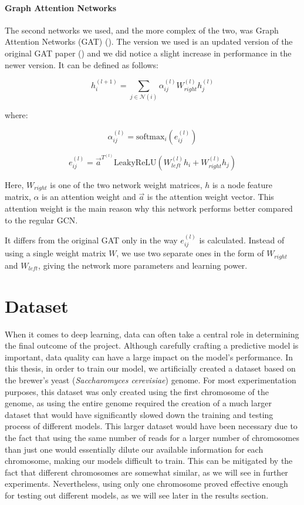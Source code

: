 \documentclass[times, utf8, diplomski, english]{fer_eng}
\begin{document}
\subsubsection{Graph Attention Networks}

The second networks we used, and the more complex of the two, was Graph Attention Networks (GAT) (\cite{GATv2}). The version we used is an updated version of the original GAT paper (\cite{GAT}) and we did notice a slight increase in performance in the newer version. It can be defined as follows:

\[ h_i^{(l+1)} = \sum_{j \in \mathcal{N}(i)} \alpha_{ij}^{(l)} W_{right}^{(l)} h_j^{(l)} \]

where:

\[ \alpha_{ij}^{(l)} = \mathrm{softmax}_i (e_{ij}^{(l)}) \]

\[ e_{ij}^{(l)} = \vec{a}^{T^{(l)}} \mathrm{LeakyReLU} (W_{left}^{(l)} h_i + W_{right}^{(l)} h_j) \]

Here, $W_{right}$ is one of the two network weight matrices, $h$ is a node feature matrix, $\alpha$ is an attention weight and $\vec{a}$ is the attention weight vector. This attention weight is the main reason why this network performs better compared to the regular GCN.

It differs from the original GAT only in the way $e_{ij}^{(l)}$ is calculated. Instead of using a single weight matrix $W$, we use two separate ones in the form of $W_{right}$ and $W_{left}$, giving the network more parameters and learning power.

\chapter{Dataset}

When it comes to deep learning, data can often take a central role in determining the final outcome of the project. Although carefully crafting a predictive model is important, data quality can have a large impact on the model's performance. In this thesis, in order to train our model, we artificially created a dataset based on the brewer's yeast (\textit{Saccharomyces cerevisiae}) genome. For most experimentation purposes, this dataset was only created using the first chromosome of the genome, as using the entire genome required the creation of a much larger dataset that would have significantly slowed down the training and testing process of different models. This larger dataset would have been necessary due to the fact that using the same number of reads for a larger number of chromosomes than just one would essentially dilute our available information for each chromosome, making our models difficult to train. This can be mitigated by the fact that different chromosomes are somewhat similar, as we will see in further experiments. Nevertheless, using only one chromosome proved effective enough for testing out different models, as we will see later in the results section.
\end{document}
